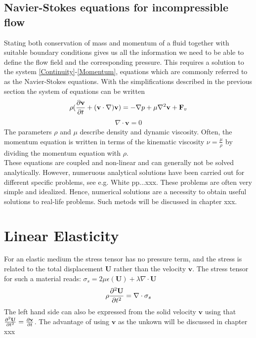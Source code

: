 \subsection{Navier-Stokes equations for incompressible flow}
Stating both conservation of mass and momentum of a fluid together with suitable boundary conditions gives us all the information we need to be able to define the flow field and the corresponding pressure. This requires a solution to the system \eqref{Continuity}-\eqref{Momentum}, equations which are commonly referred to as the Navier-Stokes equations. With the simplifications described in the previous section the system of equations can be written
\begin{align}
\rho(\frac{\partial \mathbf{v}}{\partial t} + (\mathbf{v} \cdot \nabla) \mathbf{v}) = -\nabla p + \mu\nabla^2 \mathbf{v} + \mathbf{F}_v \label{Navier}
\end{align}
\begin{align}
\nabla \cdot \mathbf{v} = 0 \label{Stokes}
\end{align}
The parameters $\rho$ and $\mu$ describe density and dynamic viscosity. Often, the momentum equation is written in terms of the kinematic viscosity $\nu = \frac{\mu}{\rho}$ by dividing the momentum equation with $\rho$. \\
These equations are coupled and non-linear and can generally not be solved analytically. However, numeruous analytical solutions have been carried out for different specific problems, see e.g. White \cite{Whit06} pp...xxx. These problems are often very simple and idealized. Hence, numerical solutions are a necessity to obtain useful solutions to real-life problems. Such metods will be discussed in chapter xxx. 


\section{Linear Elasticity}
For an elastic medium the stress tensor has no pressure term, and the stress is related to the total displacement $\mathbf{U}$ rather than the velocity $\mathbf{v}$. The stress tensor for such a material reads:
$\sigma_s = 2\mu\epsilon(\mathbf{U}) + \lambda \nabla \cdot \mathbf{U}$
\begin{align} 
\rho \frac{\partial ^2\mathbf{U}}{\partial t^2} = \nabla \cdot \sigma_s \label{LE}
\end{align}
The left hand side can also be expressed from the solid velocity $\mathbf{v}$ using that $\frac{\partial ^2\mathbf{U}}{\partial t^2} = \frac{\partial \mathbf{v}}{\partial t} $. The advantage of using $\mathbf{v}$ as the unkown will be discussed in chapter xxx 
